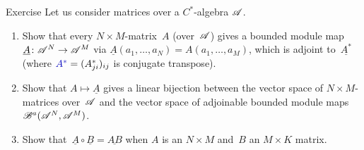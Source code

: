 \documentclass[a]{subfiles}
\begin{document}
\begin{parsec}
	\begin{point}{Exercise}%
Let us consider matrices over a $C^*$-algebra $\mathscr{A}$.
\begin{enumerate}
\item
	Show that every $N\times M$-matrix~$A$ (over~$\mathscr{A}$)
gives a bounded module map~$\underline{A}\colon \mathscr{A}^N\to\mathscr{A}^M$ 
via $\underline{A}(a_1,\dotsc,a_N)= A(a_1,\dotsc,a_M)$,
which is adjoint to~$\underline{A^*}$
(where $\Define{A^*}= (A_{ji}^*)_{ij}$ is conjugate transpose).

\item
Show that $A\mapsto \underline{A}$
gives a linear bijection between the vector 
space of $N\times M$-matrices 
over~$\mathscr{A}$ and the vector space of adjoinable bounded
module maps~$\mathscr{B}^a(\mathscr{A}^N,\mathscr{A}^M)$.

\item
Show that~$\underline{A}\circ \underline{B} = \underline{AB}$
when $A$ is an $N\times M$ and~$B$ an $M\times K$ matrix.


\end{enumerate}
\end{point}
\end{parsec}
\end{document}
